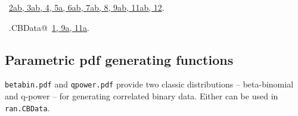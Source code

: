 \documentclass[reqno]{amsart}
\renewcommand{\NWlink}[2]{\hyperlink{#1}{#2}}
\begin{document}
\begin{flushleft}
\begin{list}{}{\setlength{\itemsep}{-\parsep}\setlength{\itemindent}{-\leftmargin}}
\item \NWtxtFileDefBy\ \NWlink{nuweb2a}{2a}\NWlink{nuweb2b}{b}\NWlink{nuweb3a}{, 3a}\NWlink{nuweb3b}{b}\NWlink{nuweb4}{, 4}\NWlink{nuweb5a}{, 5a}\NWlink{nuweb6a}{, 6a}\NWlink{nuweb6b}{b}\NWlink{nuweb7a}{, 7a}\NWlink{nuweb7b}{b}\NWlink{nuweb8}{, 8}\NWlink{nuweb9a}{, 9a}\NWlink{nuweb9b}{b}\NWlink{nuweb11a}{, 11a}\NWlink{nuweb11b}{b}\NWlink{nuweb12}{, 12}.
\item \NWtxtIdentsDefed\nobreak\  \verb@ran.CBData@\nobreak\ \NWlink{nuweb1}{1}\NWlink{nuweb9a}{, 9a}\NWlink{nuweb11a}{, 11a}.
\item{}
\end{list}
\vspace{4ex}
\end{flushleft}
\subsection{Parametric pdf generating functions}
\texttt{betabin.pdf} and \texttt{qpower.pdf} provide two classic distributions --
beta-binomial and q-power -- for generating correlated binary data. Either
can be used in \texttt{ran.CBData}.
\end{document}
